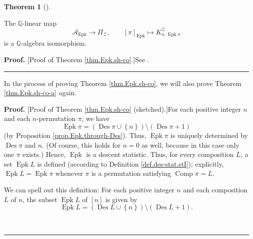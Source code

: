 \documentclass[numbers=enddot,12pt,final,onecolumn,notitlepage]{scrartcl}%
\theoremstyle{definition}
\newtheorem{theo}{Theorem}[section]
\newenvironment{theorem}[1][]
{\begin{theo}[#1]\begin{leftbar}}
{\end{leftbar}\end{theo}}
\newenvironment{proof}[1][Proof]{\noindent\textbf{#1.} }{\ \rule{0.5em}{0.5em}}
\newenvironment{verlong}{}{}
\newenvironment{vershort}{}{}
\newenvironment{noncompile}{}{}
\begin{document}
\begin{theorem}
\label{thm.Epk.sh-co}The $\mathbb{Q}$-linear map
\[
\mathcal{A}_{\operatorname*{Epk}} \to \Pi_{\mathcal{Z}}, \qquad
\left[  \pi\right]  _{\operatorname*{Epk}}\mapsto
K_{n,\operatorname*{Epk} \pi}^{\mathcal{Z}}
\]
is a $\mathbb{Q}$-algebra isomorphism.
\end{theorem}

\begin{vershort}
\begin{proof}
[Proof of Theorem \ref{thm.Epk.sh-co}.]See \cite{verlong}.
\end{proof}
\end{vershort}

\begin{verlong}
In the process of proving Theorem \ref{thm.Epk.sh-co}, we will also prove
Theorem \ref{thm.Epk.sh-co-a} again.

\begin{proof}
[Proof of Theorem \ref{thm.Epk.sh-co} (sketched).]For each positive integer
$n$ and each $n$-permutation $\pi$, we have%
\[
\operatorname*{Epk}\pi=\left(  \operatorname*{Des}\pi\cup\left\{  n\right\}
\right)  \setminus\left(  \operatorname*{Des}\pi+1\right)
\]
(by Proposition \ref{prop.Epk.through-Des}). Thus, $\operatorname*{Epk}\pi$ is
uniquely determined by $\operatorname*{Des}\pi$ and $n$. (Of course, this
holds for $n=0$ as well, because in this case only one $\pi$ exists.) Hence,
$\operatorname*{Epk}$ is a descent statistic. Thus, for every composition $L$,
a set $\operatorname*{Epk}L$ is defined (according to Definition
\ref{def.des-stat.stI}); explicitly, $\operatorname*{Epk}L=\operatorname*{Epk}%
\pi$ whenever $\pi$ is a permutation satisfying $\operatorname*{Comp}\pi=L$.

\begin{noncompile}
We can spell out this definition: For each positive integer $n$ and each
composition $L$ of $n$, the subset $\operatorname*{Epk}L$ of $\left[
n\right]  $ is given by%
\[
\operatorname*{Epk}L=\left(  \operatorname*{Des}L\cup\left\{  n\right\}
\right)  \setminus\left(  \operatorname*{Des}L+1\right)  .
\]

\end{noncompile}


\end{proof}
\end{verlong}
\end{document}

